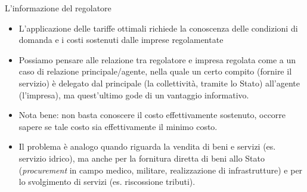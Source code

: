 \documentclass[aspectratio=149,11pt]{beamer}
\begin{document}
\begin{frame}{L'informazione del regolatore}
\begin{itemize}
\item L'applicazione delle tariffe ottimali richiede la conoscenza delle
condizioni di domanda e i costi sostenuti dalle imprese regolamentate
\item Possiamo pensare alle relazione tra regolatore e impresa regolata come a un
caso di relazione \alert{principale/agente}, nella quale un certo compito (fornire
il servizio) è delegato dal principale (la collettività, tramite lo Stato)
all'agente (l'impresa), ma quest'ultimo gode di un vantaggio informativo.
\item Nota bene: non basta conoscere il costo effettivamente sostenuto, occorre
sapere se tale costo sia effettivamente il \alert{minimo costo}.
\item Il problema è analogo quando riguarda la vendita di beni e servizi
(es. servizio idrico), ma anche per la fornitura diretta di beni allo Stato
(\emph{procurement} in campo medico, militare, realizzazione di infrastrutture) e
per lo svolgimento di servizi (es. riscossione tributi).
\end{itemize}
\end{frame}
\end{document}
